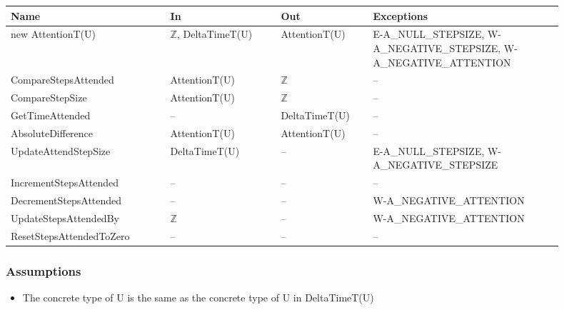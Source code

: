 \begin{center}
    \renewcommand{\arraystretch}{1.2}
    \begin{tabular}{m{0.26\linewidth} m{0.18\linewidth} m{0.15\linewidth}
            m{0.31\linewidth}}
        \toprule
        \textbf{Name} & \textbf{In} & \textbf{Out} & \textbf{Exceptions} \\
        \midrule

        \rowcolor[gray]{0.9}new AttentionT(U) & $\mathbb{Z}$, DeltaTimeT(U) &
        AttentionT(U) & E-A\_NULL\_STEPSIZE, \newline W-A\_NEGATIVE\_STEPSIZE,
        W-A\_NEGATIVE\_ATTENTION \\

        CompareStepsAttended & AttentionT(U) & $\mathbb{Z}$ & -- \\

        \rowcolor[gray]{0.9}CompareStepSize & AttentionT(U) & $\mathbb{Z}$ & --
        \\

        GetTimeAttended & -- & DeltaTimeT(U) & -- \\

        \rowcolor[gray]{0.9}AbsoluteDifference & AttentionT(U) & AttentionT(U)
        & -- \\

        UpdateAttendStepSize & DeltaTimeT(U) & -- & E-A\_NULL\_STEPSIZE,
        \newline W-A\_NEGATIVE\_STEPSIZE \\

        \rowcolor[gray]{0.9}IncrementStepsAttended & -- & -- & -- \\

        DecrementStepsAttended & -- & -- & W-A\_NEGATIVE\_ATTENTION \\

        \rowcolor[gray]{0.9}UpdateStepsAttendedBy & $\mathbb{Z}$ & -- &
        W-A\_NEGATIVE\_ATTENTION \\

        ResetStepsAttendedToZero & -- & -- & -- \\

        \bottomrule
    \end{tabular}
\end{center}

\subsubsection{Assumptions}
\begin{itemize}
    \item The concrete type of U is the same as the concrete type of U in
    DeltaTimeT(U)
\end{itemize}

